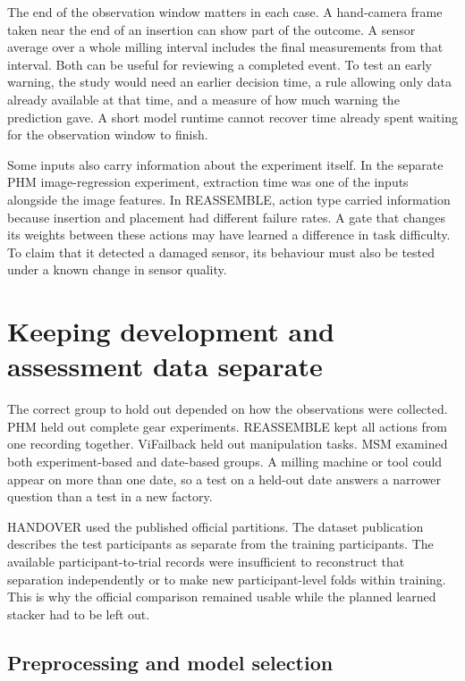 The end of the observation window matters in each case. A hand-camera frame taken near the end of an insertion can show part of the outcome. A sensor average over a whole milling interval includes the final measurements from that interval. Both can be useful for reviewing a completed event. To test an early warning, the study would need an earlier decision time, a rule allowing only data already available at that time, and a measure of how much warning the prediction gave. A short model runtime cannot recover time already spent waiting for the observation window to finish.

Some inputs also carry information about the experiment itself. In the separate PHM image-regression experiment, extraction time was one of the inputs alongside the image features. In REASSEMBLE, action type carried information because insertion and placement had different failure rates. A gate that changes its weights between these actions may have learned a difference in task difficulty. To claim that it detected a damaged sensor, its behaviour must also be tested under a known change in sensor quality.

\section{Keeping development and assessment data separate}
\label{sec:ch4-assessment}

The correct group to hold out depended on how the observations were collected. PHM held out complete gear experiments. REASSEMBLE kept all actions from one recording together. ViFailback held out manipulation tasks. MSM examined both experiment-based and date-based groups. A milling machine or tool could appear on more than one date, so a test on a held-out date answers a narrower question than a test in a new factory.

HANDOVER used the published official partitions. The dataset publication describes the test participants as separate from the training participants. The available participant-to-trial records were insufficient to reconstruct that separation independently or to make new participant-level folds within training. This is why the official comparison remained usable while the planned learned stacker had to be left out.

\subsection{Preprocessing and model selection}

